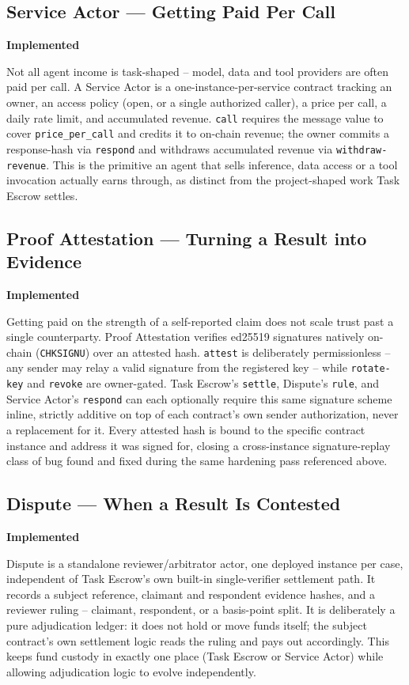 \documentclass[11pt,oneside]{article}
\newcommand{\implemented}{\textbf{Implemented}}
\begin{document}
\subsection{Service Actor --- Getting Paid Per Call} \hfill \implemented

Not all agent income is task-shaped -- model, data and tool providers are often paid per
call. A Service Actor is a one-instance-per-service contract tracking an owner, an access
policy (open, or a single authorized caller), a price per call, a daily rate limit, and
accumulated revenue. \texttt{call} requires the message value to cover \texttt{price\_per\_call}
and credits it to on-chain revenue; the owner commits a response-hash via \texttt{respond} and
withdraws accumulated revenue via \texttt{withdraw-revenue}. This is the primitive an agent
that sells inference, data access or a tool invocation actually earns through, as distinct
from the project-shaped work Task Escrow settles.

\subsection{Proof Attestation --- Turning a Result into Evidence} \hfill \implemented

Getting paid on the strength of a self-reported claim does not scale trust past a single
counterparty. Proof Attestation verifies ed25519 signatures natively on-chain
(\texttt{CHKSIGNU}) over an attested hash. \texttt{attest} is deliberately permissionless --
any sender may relay a valid signature from the registered key -- while \texttt{rotate-key}
and \texttt{revoke} are owner-gated. Task Escrow's \texttt{settle}, Dispute's \texttt{rule},
and Service Actor's \texttt{respond} can each optionally require this same signature scheme
inline, strictly additive on top of each contract's own sender authorization, never a
replacement for it. Every attested hash is bound to the specific contract instance and
address it was signed for, closing a cross-instance signature-replay class of bug found and
fixed during the same hardening pass referenced above.

\subsection{Dispute --- When a Result Is Contested} \hfill \implemented

Dispute is a standalone reviewer/arbitrator actor, one deployed instance per case, independent
of Task Escrow's own built-in single-verifier settlement path. It records a subject reference,
claimant and respondent evidence hashes, and a reviewer ruling -- claimant, respondent, or a
basis-point split. It is deliberately a pure adjudication ledger: it does not hold or move
funds itself; the subject contract's own settlement logic reads the ruling and pays out
accordingly. This keeps fund custody in exactly one place (Task Escrow or Service Actor)
while allowing adjudication logic to evolve independently.
\end{document}
